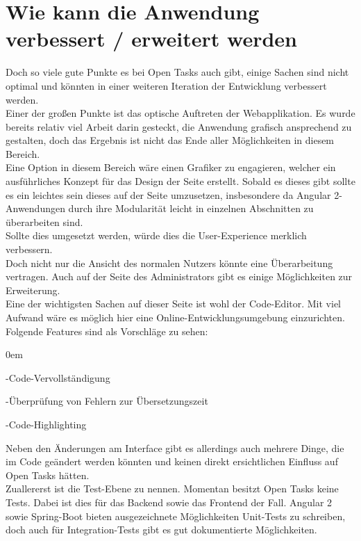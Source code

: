 \section{Wie kann die Anwendung verbessert / erweitert werden}

Doch so viele gute Punkte es bei Open Tasks auch gibt, einige Sachen sind nicht optimal und könnten in einer weiteren Iteration der Entwicklung verbessert werden. \\

Einer der großen Punkte ist das optische Auftreten der Webapplikation. Es wurde bereits relativ viel Arbeit darin gesteckt, die Anwendung grafisch ansprechend zu gestalten, doch das Ergebnis ist nicht das Ende aller Möglichkeiten in diesem Bereich. \\
Eine Option in diesem Bereich wäre  einen Grafiker zu engagieren, welcher ein ausführliches Konzept für das Design der Seite erstellt. Sobald es dieses gibt sollte es ein leichtes sein dieses auf der Seite umzusetzen, insbesondere da Angular 2-Anwendungen durch ihre Modularität leicht in einzelnen Abschnitten zu überarbeiten sind.\\
Sollte dies umgesetzt werden, würde dies die User-Experience merklich verbessern. \\

Doch nicht nur die Ansicht des normalen Nutzers könnte eine Überarbeitung vertragen. Auch auf der Seite des Administrators gibt es einige Möglichkeiten zur Erweiterung.\\
Eine der wichtigsten Sachen auf dieser Seite ist wohl der Code-Editor. Mit viel Aufwand wäre es möglich hier eine Online-Entwicklungsumgebung einzurichten. Folgende Features sind als Vorschläge zu sehen:
\begin{description}
\itemsep0em
\item -Code-Vervollständigung
\item -Überprüfung von Fehlern zur Übersetzungszeit
\item -Code-Highlighting
\end{description}


Neben den Änderungen am Interface gibt es allerdings auch mehrere Dinge, die im Code geändert werden könnten und keinen direkt ersichtlichen Einfluss auf Open Tasks hätten.\\

Zuallererst ist die Test-Ebene zu nennen. Momentan besitzt Open Tasks keine Tests. Dabei ist dies für das Backend sowie das Frontend der Fall. Angular 2 sowie Spring-Boot bieten ausgezeichnete Möglichkeiten Unit-Tests zu schreiben, doch auch für Integration-Tests gibt es gut dokumentierte Möglichkeiten. \\

